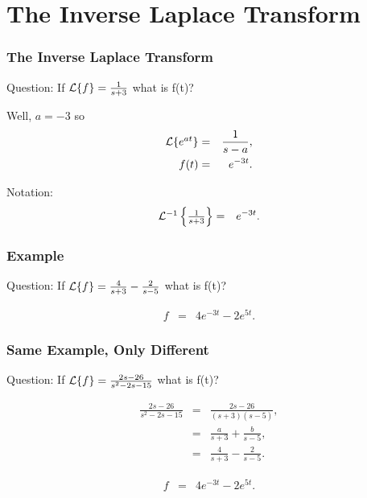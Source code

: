 \section{The Inverse Laplace Transform}


\begin{frame}
  \frametitle{The Inverse Laplace Transform}

  \begin{block}{Question:}
    If $\laplace{f} = \frac{1}{s+3}$ what is f(t)?
  \end{block}

  {
    Well, $a=-3$ so
    \begin{eqnarray*}
      \laplace{e^{at}} & = & \frac{1}{s-a}, \\
      f(t) & = & e^{-3t}.
    \end{eqnarray*}
  }

  {
    Notation:
    \begin{eqnarray*}
      \invlaplace{\frac{1}{s+3}} & = & e^{-3t}.
    \end{eqnarray*}
  }

\end{frame}


\begin{frame}
  \frametitle{Example}

  \begin{block}{Question:}
    If $\laplace{f} = \frac{4}{s+3}-\frac{2}{s-5}$ what is f(t)?
  \end{block}

  {
    \begin{eqnarray*}
      f & = & 4 e^{-3t} - 2 e^{5t}.
    \end{eqnarray*}
  }

\end{frame}


\begin{frame}
  \frametitle{Same Example, Only Different}

  \begin{block}{Question:}
    If $\laplace{f} = \frac{2s-26}{s^2-2s-15}$ what is f(t)?
  \end{block}

  {
    \begin{eqnarray*}
      \frac{2s-26}{s^2-2s-15} & = & \frac{2s-26}{(s+3)(s-5)}, \\
      & = & \frac{a}{s+3} + \frac{b}{s-5}, \\
      & = & \frac{4}{s+3} - \frac{2}{s-5}.
    \end{eqnarray*}
  }

  {
    \begin{eqnarray*}
      f & = & 4 e^{-3t} - 2 e^{5t}.
    \end{eqnarray*}
  }


\end{frame}


